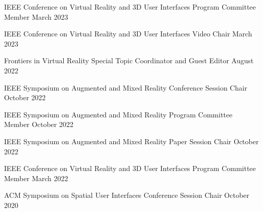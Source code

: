 
\begin{cventries}
  
  \cventry
    {IEEE Conference on Virtual Reality and 3D User Interfaces} %
    {Program Committee Member} %
    {March 2023} %
    {} %
    {}
    \vspace{-0.15in}
  
  \cventry
    {IEEE Conference on Virtual Reality and 3D User Interfaces} %
    {Video Chair} %
    {March 2023} %
    {} %
    {}
    \vspace{-0.15in}

  \cventry
    {Frontiers in Virtual Reality} %
    {Special Topic Coordinator and Guest Editor} %
    {August 2022} %
    {} %
    {}
    \vspace{-0.15in}

  \cventry
    {IEEE Symposium on Augmented and Mixed Reality} %
    {Conference Session Chair} %
    {October 2022} %
    {} %
    {}
    \vspace{-0.15in}

  \cventry
    {IEEE Symposium on Augmented and Mixed Reality} %
    {Program Committee Member} %
    {October 2022} %
    {} %
    {}
    \vspace{-0.15in}

  \cventry
    {IEEE Symposium on Augmented and Mixed Reality} %
    {Paper Session Chair} %
    {October 2022} %
    {} %
    {}
    \vspace{-0.15in}
  
  \cventry
    {IEEE Conference on Virtual Reality and 3D User Interfaces} %
    {Program Committee Member} %
    {March 2022} %
    {} %
    {}
    \vspace{-0.15in}
    
  \cventry
    {ACM Symposium on Spatial User Interfaces} %
    {Conference Session Chair} %
    {October 2020} %
    {} %
    {}
    \vspace{-0.15in}


\end{cventries}

